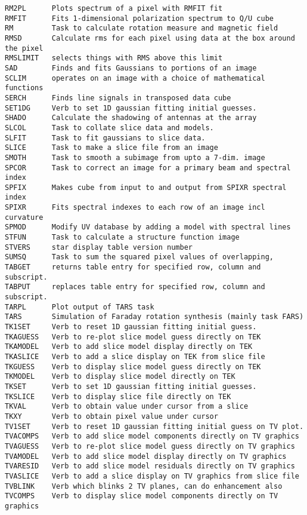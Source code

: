 \begin{verbatim}
RM2PL      Plots spectrum of a pixel with RMFIT fit
RMFIT      Fits 1-dimensional polarization spectrum to Q/U cube
RM         Task to calculate rotation measure and magnetic field
RMSD       Calculate rms for each pixel using data at the box around the pixel
RMSLIMIT   selects things with RMS above this limit
SAD        Finds and fits Gaussians to portions of an image
SCLIM      operates on an image with a choice of mathematical functions
SERCH      Finds line signals in transposed data cube
SET1DG     Verb to set 1D gaussian fitting initial guesses.
SHADO      Calculate the shadowing of antennas at the array
SLCOL      Task to collate slice data and models.
SLFIT      Task to fit gaussians to slice data.
SLICE      Task to make a slice file from an image
SMOTH      Task to smooth a subimage from upto a 7-dim. image
SPCOR      Task to correct an image for a primary beam and spectral index
SPFIX      Makes cube from input to and output from SPIXR spectral index
SPIXR      Fits spectral indexes to each row of an image incl curvature
SPMOD      Modify UV database by adding a model with spectral lines
STFUN      Task to calculate a structure function image
STVERS     star display table version number
SUMSQ      Task to sum the squared pixel values of overlapping,
TABGET     returns table entry for specified row, column and subscript.
TABPUT     replaces table entry for specified row, column and subscript.
TARPL      Plot output of TARS task
TARS       Simulation of Faraday rotation synthesis (mainly task FARS)
TK1SET     Verb to reset 1D gaussian fitting initial guess.
TKAGUESS   Verb to re-plot slice model guess directly on TEK
TKAMODEL   Verb to add slice model display directly on TEK
TKASLICE   Verb to add a slice display on TEK from slice file
TKGUESS    Verb to display slice model guess directly on TEK
TKMODEL    Verb to display slice model directly on TEK
TKSET      Verb to set 1D gaussian fitting initial guesses.
TKSLICE    Verb to display slice file directly on TEK
TKVAL      Verb to obtain value under cursor from a slice
TKXY       Verb to obtain pixel value under cursor
TV1SET     Verb to reset 1D gaussian fitting initial guess on TV plot.
TVACOMPS   Verb to add slice model components directly on TV graphics
TVAGUESS   Verb to re-plot slice model guess directly on TV graphics
TVAMODEL   Verb to add slice model display directly on TV graphics
TVARESID   Verb to add slice model residuals directly on TV graphics
TVASLICE   Verb to add a slice display on TV graphics from slice file
TVBLINK    Verb which blinks 2 TV planes, can do enhancement also
TVCOMPS    Verb to display slice model components directly on TV graphics

\end{verbatim}
